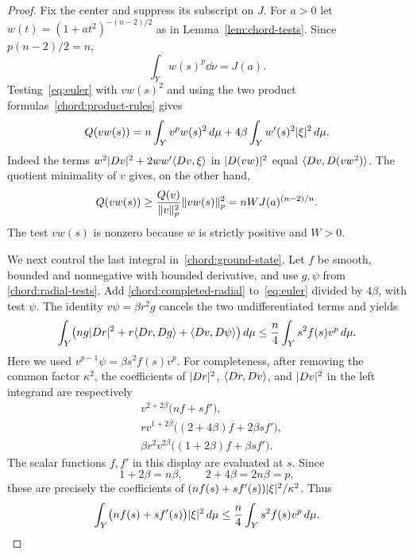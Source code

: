 \begin{proof}
Fix the center and suppress its subscript on $J$. For $a>0$ let
$w(t)=(1+at^2)^{-(n-2)/2}$ as in
Lemma~\ref{lem:chord-tests}. Since $p(n-2)/2=n$,
\[
 \int_Y w(s)^p\dd\nu=J(a).
\]
Testing~\eqref{eq:euler} with $vw(s)^2$ and using
the two product formulas~\eqref{chord:product-rules} gives
\begin{equation}\label{chord:ground-state}
 Q(vw(s))
    =n\int_Y v^p w(s)^2\,d\mu
              +4\beta\int_Y w'(s)^2\lvert\xi\rvert^2\,d\mu.
\end{equation}
Indeed the terms $w^2\lvert Dv\rvert^2+2ww'\langle Dv,\xi\rangle$ in
$\lvert D(vw)\rvert^2$ equal $\langle Dv,D(vw^2)\rangle$. The quotient
minimality of $v$ gives, on the other hand,
\begin{equation}\label{chord:quotient}
 Q(vw(s))\ge
   \frac{Q(v)}{\lVert v\rVert_p^2}\lVert vw(s)\rVert_p^2
                   =nW J(a)^{(n-2)/n}.
\end{equation}
The test $vw(s)$ is nonzero because $w$ is strictly positive
and $W>0$.

We next control the last integral
in~\eqref{chord:ground-state}. Let $f$ be smooth, bounded and
nonnegative with bounded derivative, and use $g,\psi$ from
\eqref{chord:radial-tests}. Add
\eqref{chord:completed-radial} to~\eqref{eq:euler} divided by
$4\beta$, with test $\psi$. The identity
$v\psi=\beta r^2g$ cancels the two undifferentiated terms and
yields
\begin{equation}\label{chord:added-tests}
 \int_Y\bigl(ng\lvert Dr\rvert^2+r\langle Dr,Dg\rangle
                              +\langle Dv,D\psi\rangle\bigr)\,d\mu
       \le\frac n4\int_Y s^2f(s)v^p\,d\mu.
\end{equation}
Here we used
$v^{p-1}\psi=\beta s^2f(s)v^p$.
For completeness, after removing the common factor $\kappa^2$,
the coefficients of $\lvert Dr\rvert^2$, $\langle Dr,Dv\rangle$, and
$\lvert Dv\rvert^2$ in the left integrand are respectively
\begin{align*}
 &v^{2+2\beta}\bigl(nf+sf'\bigr),\\
 &r v^{1+2\beta}\bigl((2+4\beta)f+2\beta sf'\bigr),\\
 &\beta r^2v^{2\beta}\bigl((1+2\beta)f+\beta sf'\bigr).
\end{align*}
The scalar functions $f,f'$ in this display are evaluated at
$s$. Since
\begin{equation}\label{chord:exponent-identities}
 1+2\beta=n\beta,\qquad 2+4\beta=2n\beta=p,
\end{equation}
these are precisely the coefficients of
$(nf(s)+sf'(s))\lvert\xi\rvert^2/\kappa^2$. Thus
\begin{equation}\label{chord:energy}
 \int_Y\bigl(nf(s)+sf'(s)\bigr)\lvert\xi\rvert^2\,d\mu
               \le\frac n4\int_Ys^2f(s)v^p\,d\mu.
\end{equation}


\end{proof}
